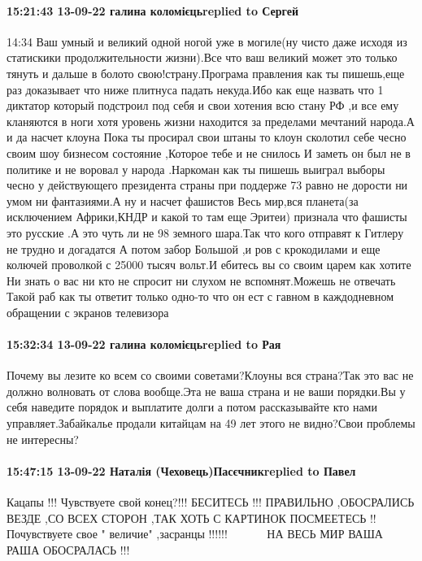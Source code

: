 \paragraph{15:21:43 13-09-22 галина коломієцьreplied to Сергей}
14:34
Ваш умный и великий одной ногой уже в могиле(ну чисто даже исходя из статискики
продолжительности жизни).Все что ваш великий может это только тянуть и дальше в
болото свою!страну.Програма правления как ты пишешь,еще раз доказывает что ниже
плитнуса падать некуда.Ибо как еще назвать что 1 диктатор который подстроил под
себя и свои хотения всю стану РФ ,и все ему кланяются в ноги хотя уровень жизни
находится за пределами мечтаний народа.А и да насчет клоуна Пока ты просирал
свои штаны то клоун сколотил себе чесно своим шоу бизнесом состояние ,Которое
тебе и не снилось И заметь он был не в политике и не воровал у народа .Наркоман
как ты пишешь выиграл выборы чесно у действующего президента страны при
поддерже 73 %
равно не дорости ни умом ни фантазиями.А ну и насчет фашистов Весь мир,вся
планета(за исключением Африки,КНДР и какой то там еще Эритеи) признала что
фашисты это русские .А это чуть ли не 98%
земного шара.Так что кого отправят к Гитлеру не трудно и догадатся А потом
забор Большой ,и ров с крокодилами и еще колючей проволкой с 25000 тысяч
вольт.И ебитесь вы со своим царем как хотите Ни знать о вас ни кто не спросит
ни слухом не вспомнят.Можешь не отвечать Такой раб как ты ответит только
одно-то что он ест с гавном в каждодневном обращении с экранов телевизора

\paragraph{15:32:34 13-09-22 галина коломієцьreplied to Рая}

Почему вы лезите ко всем со своими советами?Клоуны вся страна?Так это вас не
должно волновать от слова вообще.Эта не ваша страна и не ваши порядки.Вы у себя
наведите порядок и выплатите долги а потом рассказывайте кто нами
управляет.Забайкалье продали китайцам на 49 лет этого не видно?Свои проблемы не
интересны?


\paragraph{15:47:15 13-09-22 Наталія (Чеховець)Пасєчникreplied to Павел}

Кацапы !!! Чувствуете свой конец?!!! БЕСИТЕСЬ !!! ПРАВИЛЬНО ,ОБОСРАЛИСЬ ВЕЗДЕ
,СО ВСЕХ СТОРОН ,ТАК ХОТЬ С КАРТИНОК ПОСМЕЕТЕСЬ !! Почувствуете свое " величие"
,засранцы !!!!!! 🤣🤣🤣🤣🤣🤣🤣🤣🤣🤣 НА ВЕСЬ МИР ВАША РАША ОБОСРАЛАСЬ !!!

